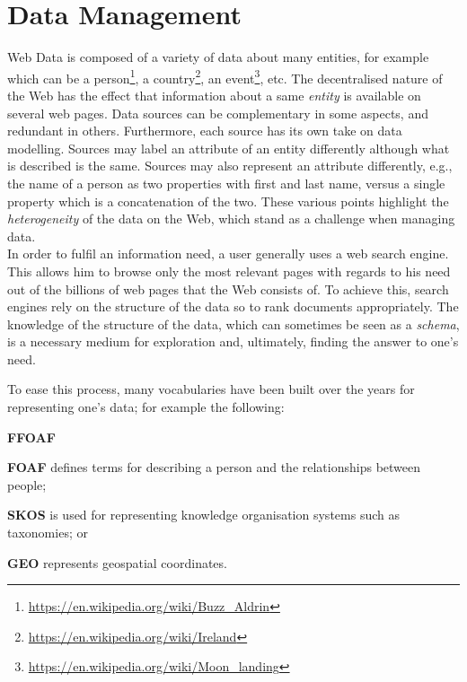 \section{Data Management}
\label{chap:introduction:data-mgmt}

Web Data is composed of a variety of data about many entities, for example which can be a person\footnote{\url{https://en.wikipedia.org/wiki/Buzz_Aldrin}}, a country\footnote{\url{https://en.wikipedia.org/wiki/Ireland}}, an event\footnote{\url{https://en.wikipedia.org/wiki/Moon_landing}}, etc.
The decentralised nature of the Web has the effect that information about a same \emph{entity} is available on several web pages. Data sources can be complementary in some aspects, and redundant in others. Furthermore, each source has its own take on data modelling. Sources may label an attribute of an entity differently although what is described is the same. Sources may also represent an attribute differently, e.g., the name of a person as two properties with first and last name, versus a single property which is a concatenation of the two. These various points highlight the \emph{heterogeneity} of the data on the Web, which stand as a challenge when managing data.\\

In order to fulfil an information need, a user generally uses a web search engine. This allows him to browse only the most relevant pages with regards to his need out of the billions of web pages that the Web consists of. To achieve this, search engines rely on the structure of the data so to rank documents appropriately. The knowledge of the structure of the data, which can sometimes be seen as a \emph{schema}, is a necessary medium for exploration and, ultimately, finding the answer to one's need.

To ease this process, many vocabularies have been built over the years for representing one's data; for example the following:
\begin{labeling}{\textbf{FFOAF}}
	\item[\textbf{FOAF}\protect\footnotemark] defines terms for describing a person and the relationships between people;
	\item[\textbf{SKOS}\protect\footnotemark] is used for representing knowledge organisation systems such as taxonomies; or
	\item[\textbf{GEO}\protect\footnotemark] represents geospatial coordinates.
\end{labeling}

